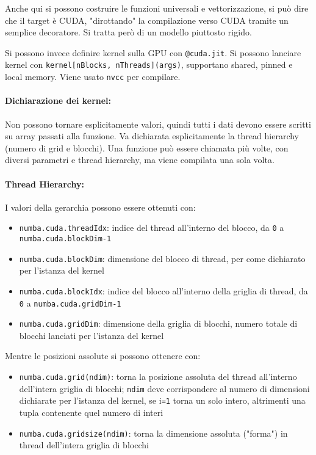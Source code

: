 Anche qui si possono costruire le funzioni universali e vettorizzazione, si può dire che il target è CUDA, "dirottando" la compilazione verso CUDA tramite un semplice decoratore. Si tratta però di un modello piuttosto rigido.

Si possono invece definire kernel sulla GPU con \texttt{@cuda.jit}. Si possono lanciare kernel con \texttt{kernel[nBlocks, nThreads](args)}, supportano shared, pinned e local memory. Viene usato \texttt{nvcc} per compilare.

\paragraph{Dichiarazione dei kernel:} Non possono tornare esplicitamente valori, quindi tutti i dati devono essere scritti su array passati alla funzione. Va dichiarata esplicitamente la thread hierarchy (numero di grid e blocchi). Una funzione può essere chiamata più volte, con diversi parametri e thread hierarchy, ma viene compilata una sola volta.

\paragraph{Thread Hierarchy:} I valori della gerarchia possono essere ottenuti con: 
\begin{itemize}
	\item \texttt{numba.cuda.threadIdx}: indice del thread all'interno del blocco, da \texttt{0} a \texttt{numba.cuda.blockDim-1}
	
	\item \texttt{numba.cuda.blockDim}: dimensione del blocco di thread, per come dichiarato per l'istanza del kernel 
	
	\item \texttt{numba.cuda.blockIdx}: indice del blocco all'interno della griglia di thread, da \texttt{0} a \texttt{numba.cuda.gridDim-1}
	
	\item \texttt{numba.cuda.gridDim}: dimensione della griglia di blocchi, numero totale di blocchi lanciati per l'istanza del kernel
\end{itemize}

Mentre le posizioni assolute si possono ottenere con: 
\begin{itemize}
	\item \texttt{numba.cuda.grid(ndim)}: torna la posizione assoluta del thread all'interno dell'intera griglia di blocchi; \texttt{ndim} deve corrispondere al numero di dimensioni dichiarate per l'istanza del kernel, se i\texttt{=1} torna un solo intero, altrimenti una tupla contenente quel numero di interi
	
	\item \texttt{numba.cuda.gridsize(ndim)}: torna la dimensione assoluta ("forma") in thread dell'intera griglia di blocchi
\end{itemize}

